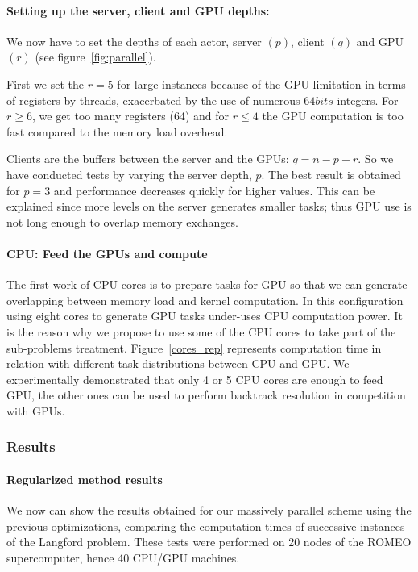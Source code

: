 \paragraph{Setting up the server, client and GPU depths: }
We now have to set the depths of each actor, server $(p)$, client $(q)$ and GPU $(r)$ (see figure~\ref{fig:parallel}).

First we set the $r = 5$ for large instances because of the GPU limitation in terms of registers by threads, exacerbated by the use of numerous $64bits$ integers. For $r \geq 6$, we get too many registers (64) and for $r \leq 4$ the GPU computation is too fast compared to the memory load overhead.

Clients are the buffers between the server and the GPUs: 
$q = n - p- r$.
So we have conducted tests by varying the server depth, $p$. The best result is obtained for $p=3$ and performance decreases quickly for higher values. This can be explained since more levels on the server generates smaller tasks; thus GPU use is not long enough to overlap memory exchanges.

\paragraph{CPU: Feed the GPUs and compute}
The first work of CPU cores is to prepare tasks for GPU so that we can generate overlapping between memory load and kernel computation. 
In this configuration using eight cores to generate GPU tasks under-uses CPU computation power. 
It is the reason why we propose to use some of the CPU cores to take part of the sub-problems treatment. 
Figure~\ref{cores_rep} represents computation time in relation with different task distributions between CPU and GPU.
We experimentally demonstrated that only 4 or 5 CPU cores are enough to feed GPU, the other ones can be used to perform backtrack resolution in competition with GPUs.

\subsubsection{Results}

\paragraph{Regularized method results}
We now can show the results obtained for our massively parallel scheme using the previous optimizations, comparing the computation times of successive instances of the Langford problem. These tests were performed on 20 nodes of the ROMEO supercomputer, hence 40 CPU/GPU machines.

